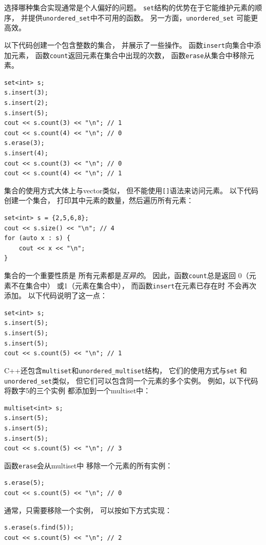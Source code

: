 选择哪种集合实现通常是个人偏好的问题。
\texttt{set}结构的优势在于它能维护元素的顺序，
并提供\texttt{unordered\_set}中不可用的函数。
另一方面，\texttt{unordered\_set}
可能更高效。

以下代码创建一个包含整数的集合，
并展示了一些操作。
函数\texttt{insert}向集合中添加元素，
函数\texttt{count}返回元素在集合中出现的次数，
函数\texttt{erase}从集合中移除元素。

\begin{lstlisting}
set<int> s;
s.insert(3);
s.insert(2);
s.insert(5);
cout << s.count(3) << "\n"; // 1
cout << s.count(4) << "\n"; // 0
s.erase(3);
s.insert(4);
cout << s.count(3) << "\n"; // 0
cout << s.count(4) << "\n"; // 1
\end{lstlisting}

集合的使用方式大体上与vector类似，
但不能使用\texttt{[]}语法来访问元素。
以下代码创建一个集合，
打印其中元素的数量，然后遍历所有元素：
\begin{lstlisting}
set<int> s = {2,5,6,8};
cout << s.size() << "\n"; // 4
for (auto x : s) {
    cout << x << "\n";
}
\end{lstlisting}

集合的一个重要性质是
所有元素都是\emph{互异的}。
因此，函数\texttt{count}总是返回
0（元素不在集合中）
或1（元素在集合中），
而函数\texttt{insert}在元素已存在时
不会再次添加。
以下代码说明了这一点：

\begin{lstlisting}
set<int> s;
s.insert(5);
s.insert(5);
s.insert(5);
cout << s.count(5) << "\n"; // 1
\end{lstlisting}

C++还包含\texttt{multiset}和\texttt{unordered\_multiset}结构，
它们的使用方式与\texttt{set}
和\texttt{unordered\_set}类似，
但它们可以包含同一个元素的多个实例。
例如，以下代码将数字5的三个实例
都添加到一个multiset中：

\begin{lstlisting}
multiset<int> s;
s.insert(5);
s.insert(5);
s.insert(5);
cout << s.count(5) << "\n"; // 3
\end{lstlisting}
函数\texttt{erase}会从multiset中
移除一个元素的所有实例：
\begin{lstlisting}
s.erase(5);
cout << s.count(5) << "\n"; // 0
\end{lstlisting}
通常，只需要移除一个实例，
可以按如下方式实现：
\begin{lstlisting}
s.erase(s.find(5));
cout << s.count(5) << "\n"; // 2
\end{lstlisting}

